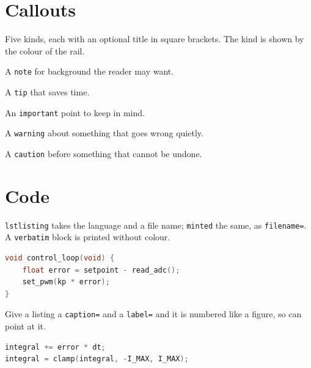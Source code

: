 \clearpage

\section{Callouts}
\label{sec:callouts}

Five kinds, each with an optional title in square brackets. The kind is shown by the colour of the rail.

\begin{note}
A \texttt{note} for background the reader may want.
\end{note}

\begin{tip}[A title]
A \texttt{tip} that saves time.
\end{tip}

\begin{important}
An \texttt{important} point to keep in mind.
\end{important}

\begin{warning}
A \texttt{warning} about something that goes wrong quietly.
\end{warning}

\begin{caution}
A \texttt{caution} before something that cannot be undone.
\end{caution}

\section{Code}
\label{sec:code}

\texttt{lstlisting} takes the language and a file name; \texttt{minted} the same, as \texttt{filename=}. A \texttt{verbatim} block is printed without colour.

\begin{lstlisting}[language=c, title=control.c]
void control_loop(void) {
    float error = setpoint - read_adc();
    set_pwm(kp * error);
}
\end{lstlisting}

Give a listing a \texttt{caption=} and a \texttt{label=} and it is numbered like a figure, so  can point at it.

\begin{lstlisting}[language=c, caption={The integral term with anti-windup}, label=lst:pid]
integral += error * dt;
integral = clamp(integral, -I_MAX, I_MAX);
\end{lstlisting}

